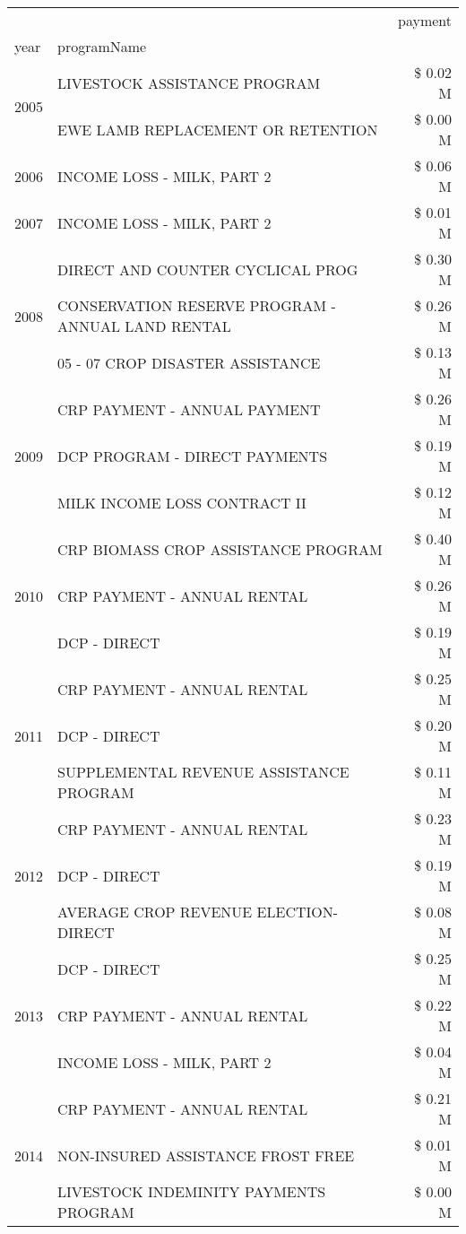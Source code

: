 \begin{tabular}{llr}
\toprule
 &  & payment \\
year & programName &  \\
\midrule
\multirow[t]{2}{*}{2005} & LIVESTOCK ASSISTANCE PROGRAM & \$ 0.02 M \\
 & EWE LAMB REPLACEMENT OR RETENTION & \$ 0.00 M \\
\cline{1-3}
2006 & INCOME LOSS - MILK, PART 2 & \$ 0.06 M \\
\cline{1-3}
2007 & INCOME LOSS - MILK, PART 2 & \$ 0.01 M \\
\cline{1-3}
\multirow[t]{3}{*}{2008} & DIRECT AND COUNTER CYCLICAL PROG & \$ 0.30 M \\
 & CONSERVATION RESERVE PROGRAM - ANNUAL LAND RENTAL & \$ 0.26 M \\
 & 05 - 07 CROP DISASTER ASSISTANCE & \$ 0.13 M \\
\cline{1-3}
\multirow[t]{3}{*}{2009} & CRP PAYMENT - ANNUAL PAYMENT & \$ 0.26 M \\
 & DCP PROGRAM - DIRECT PAYMENTS & \$ 0.19 M \\
 & MILK INCOME LOSS CONTRACT II & \$ 0.12 M \\
\cline{1-3}
\multirow[t]{3}{*}{2010} & CRP BIOMASS CROP ASSISTANCE PROGRAM & \$ 0.40 M \\
 & CRP PAYMENT - ANNUAL RENTAL & \$ 0.26 M \\
 & DCP - DIRECT & \$ 0.19 M \\
\cline{1-3}
\multirow[t]{3}{*}{2011} & CRP PAYMENT - ANNUAL RENTAL & \$ 0.25 M \\
 & DCP - DIRECT & \$ 0.20 M \\
 & SUPPLEMENTAL REVENUE ASSISTANCE PROGRAM & \$ 0.11 M \\
\cline{1-3}
\multirow[t]{3}{*}{2012} & CRP PAYMENT - ANNUAL RENTAL & \$ 0.23 M \\
 & DCP - DIRECT & \$ 0.19 M \\
 & AVERAGE CROP REVENUE ELECTION-DIRECT & \$ 0.08 M \\
\cline{1-3}
\multirow[t]{3}{*}{2013} & DCP - DIRECT & \$ 0.25 M \\
 & CRP PAYMENT - ANNUAL RENTAL & \$ 0.22 M \\
 & INCOME LOSS - MILK, PART 2 & \$ 0.04 M \\
\cline{1-3}
\multirow[t]{3}{*}{2014} & CRP PAYMENT - ANNUAL RENTAL & \$ 0.21 M \\
 & NON-INSURED ASSISTANCE FROST FREE & \$ 0.01 M \\
 & LIVESTOCK INDEMINITY PAYMENTS PROGRAM & \$ 0.00 M \\

\end{tabular}
